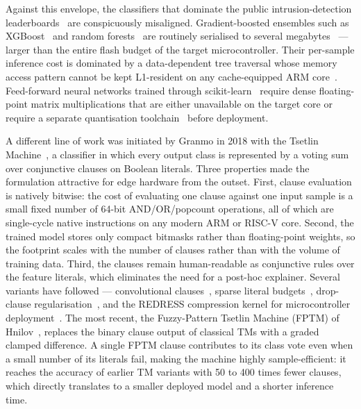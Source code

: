 \documentclass[journal,10pt]{IEEEtran}
\begin{document}
Against this envelope, the classifiers that dominate the public
intrusion-detection
leaderboards~\cite{moustafa2021ton,tavallaee2009nslkdd,hady2020wustl}
are conspicuously misaligned. Gradient-boosted ensembles such as
XGBoost~\cite{chen2016xgboost} and random
forests~\cite{breiman2001random} are routinely serialised to several
megabytes~\cite{sahu2022xgboost,verhelst2017embedded} --- larger
than the entire flash budget of the target microcontroller.
Their per-sample inference cost is dominated by a data-dependent tree
traversal whose memory access pattern cannot be kept L1-resident on
any cache-equipped
ARM core~\cite{lucas2020tree}. Feed-forward neural networks trained
through scikit-learn~\cite{pedregosa2011scikit} require dense
floating-point matrix multiplications that are either unavailable on
the target core or require a separate quantisation
toolchain~\cite{jacob2018quantization,nagel2021survey} before
deployment.

A different line of work was initiated by Granmo in 2018 with the
Tsetlin Machine~\cite{granmo2018tsetlin}, a classifier in which every
output class is represented by a voting sum over conjunctive clauses
on Boolean literals. Three properties made the formulation attractive
for edge hardware from the outset. First, clause evaluation is
natively bitwise: the cost of evaluating one clause against one input
sample is a small fixed number of 64-bit AND/OR/popcount operations,
all of which are single-cycle native instructions on any modern ARM
or RISC-V core. Second, the trained model stores only compact
bitmasks rather than floating-point weights, so the footprint scales
with the number of clauses rather than with the volume of training
data. Third, the clauses remain human-readable as conjunctive rules
over the feature literals, which eliminates the need for a post-hoc
explainer. Several variants have followed --- convolutional
clauses~\cite{granmo2019convolutional}, sparse literal
budgets~\cite{bhattarai2023concise}, drop-clause
regularisation~\cite{sharma2023drop}, and the REDRESS compression
kernel for microcontroller
deployment~\cite{maheshwari2023redress}. The most recent, the
Fuzzy-Pattern Tsetlin Machine (FPTM) of
Hnilov~\cite{hnilov2025fuzzy}, replaces the binary clause output of
classical TMs with a graded clamped difference. A single FPTM clause
contributes to its class vote even when a small number of its
literals fail, making the machine highly sample-efficient: it reaches
the accuracy of earlier TM variants with 50 to 400 times fewer
clauses, which directly translates to a smaller deployed model and a
shorter inference time.
\end{document}
